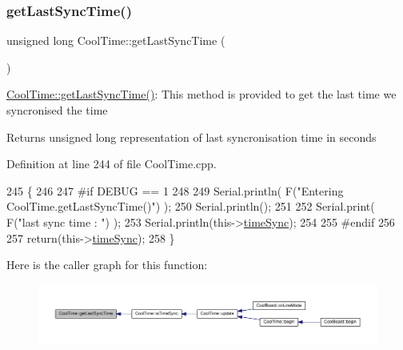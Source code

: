 \mbox{\label{class_cool_time_a5d17f707a9d337720493b2bce9d41c21}} 
\subsubsection{\texorpdfstring{get\+Last\+Sync\+Time()}{getLastSyncTime()}}
{\footnotesize\ttfamily unsigned long Cool\+Time\+::get\+Last\+Sync\+Time (\begin{DoxyParamCaption}{ }\end{DoxyParamCaption})}

\hyperlink{class_cool_time_a5d17f707a9d337720493b2bce9d41c21}{Cool\+Time\+::get\+Last\+Sync\+Time()}\+: This method is provided to get the last time we syncronised the time

\begin{DoxyReturn}{Returns}
unsigned long representation of last syncronisation time in seconds 
\end{DoxyReturn}


Definition at line 244 of file Cool\+Time.\+cpp.


\begin{DoxyCode}
245 \{
246 
247 \textcolor{preprocessor}{#if DEBUG == 1 }
248 
249     Serial.println( F(\textcolor{stringliteral}{"Entering CoolTime.getLastSyncTime()"}) );
250     Serial.println();
251     
252     Serial.print( F(\textcolor{stringliteral}{"last sync time : "}) );
253     Serial.println(this->\hyperlink{class_cool_time_a9d032e76c3470a15b3bbbc52af6463f7}{timeSync});
254 
255 \textcolor{preprocessor}{#endif }
256 
257     \textcolor{keywordflow}{return}(this->\hyperlink{class_cool_time_a9d032e76c3470a15b3bbbc52af6463f7}{timeSync});
258 \}
\end{DoxyCode}
Here is the caller graph for this function\+:\nopagebreak
\begin{figure}[H]
\begin{center}
\leavevmode
\includegraphics[width=350pt]{d6/d49/class_cool_time_a5d17f707a9d337720493b2bce9d41c21_icgraph}
\end{center}
\end{figure}
\mbox{\label{class_cool_time_a41fbbbfd651c2079f54d4b2911e4c705}} 
